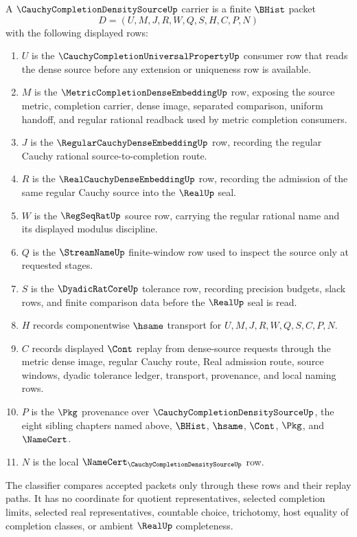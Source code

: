 \begin{definition}
\label{def:cauchy-completion-density-source-carrier}
A $\CauchyCompletionDensitySourceUp$ carrier is a finite $\BHist$ packet
$$
D=(U,M,J,R,W,Q,S,H,C,P,N)
$$
with the following displayed rows:
\begin{enumerate}
\item $U$ is the $\CauchyCompletionUniversalPropertyUp$ consumer row that reads the dense source before any extension or uniqueness row is available.
\item $M$ is the $\MetricCompletionDenseEmbeddingUp$ row, exposing the source metric, completion carrier, dense image, separated comparison, uniform handoff, and regular rational readback used by metric completion consumers.
\item $J$ is the $\RegularCauchyDenseEmbeddingUp$ row, recording the regular Cauchy rational source-to-completion route.
\item $R$ is the $\RealCauchyDenseEmbeddingUp$ row, recording the admission of the same regular Cauchy source into the $\RealUp$ seal.
\item $W$ is the $\RegSeqRatUp$ source row, carrying the regular rational name and its displayed modulus discipline.
\item $Q$ is the $\StreamNameUp$ finite-window row used to inspect the source only at requested stages.
\item $S$ is the $\DyadicRatCoreUp$ tolerance row, recording precision budgets, slack rows, and finite comparison data before the $\RealUp$ seal is read.
\item $H$ records componentwise $\hsame$ transport for $U,M,J,R,W,Q,S,C,P,N$.
\item $C$ records displayed $\Cont$ replay from dense-source requests through the metric dense image, regular Cauchy route, Real admission route, source windows, dyadic tolerance ledger, transport, provenance, and local naming rows.
\item $P$ is the $\Pkg$ provenance over $\CauchyCompletionDensitySourceUp$, the eight sibling chapters named above, $\BHist$, $\hsame$, $\Cont$, $\Pkg$, and $\NameCert$.
\item $N$ is the local $\NameCert_{\CauchyCompletionDensitySourceUp}$ row.
\end{enumerate}
The classifier compares accepted packets only through these rows and their replay paths. It has no coordinate for quotient representatives, selected completion limits, selected real representatives, countable choice, trichotomy, host equality of completion classes, or ambient $\RealUp$ completeness.
\end{definition}

